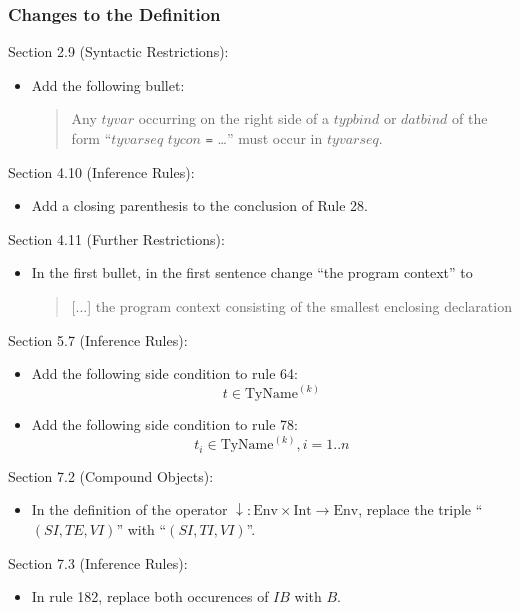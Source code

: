 \documentclass[twoside,titlepage]{article}
\begin{document}
\begin{appendix}
\subsubsection*{Changes to the Definition}

Section 2.9 (Syntactic Restrictions):
\begin{itemize}
\item Add the following bullet:
  \begin{quote}
  Any $\mathit{tyvar}$ occurring on the right side of a $\mathit{typbind}$ or $\mathit{datbind}$ of the form ``$\mathit{tyvarseq}$ $\mathit{tycon}$ {\tt=} \dots'' must occur in $\mathit{tyvarseq}$.
  \end{quote}
\end{itemize}

Section 4.10 (Inference Rules):
\begin{itemize}
\item Add a closing parenthesis to the conclusion of Rule 28.
\end{itemize}

Section 4.11 (Further Restrictions):
\begin{itemize}
\item In the first bullet, in the first sentence change ``the program context'' to 
  \begin{quote}
 [...] the program context consisting of the smallest enclosing declaration
  \end{quote}
\end{itemize}

Section 5.7 (Inference Rules):
\begin{itemize}
\item Add the following side condition to rule 64:
  $$
  t \in \mbox{TyName}^{(k)}
  $$

\item Add the following side condition to rule 78:
  $$
  t_i \in \mbox{TyName}^{(k)}, i = 1..n
  $$
\end{itemize}

Section 7.2 (Compound Objects):
\begin{itemize}
\item In the definition of the operator $\downarrow:\mbox{Env}\times\mbox{Int}\to\mbox{Env}$, replace the triple ``$(\mathit{SI},\mathit{TE},\mathit{VI})$'' with ``$(\mathit{SI},\mathit{TI},\mathit{VI})$''.
\end{itemize}

Section 7.3 (Inference Rules):
\begin{itemize}
\item In rule 182, replace both occurences of $\mathit{IB}$ with $B$.


\end{itemize}
\end{appendix}
\end{document}
